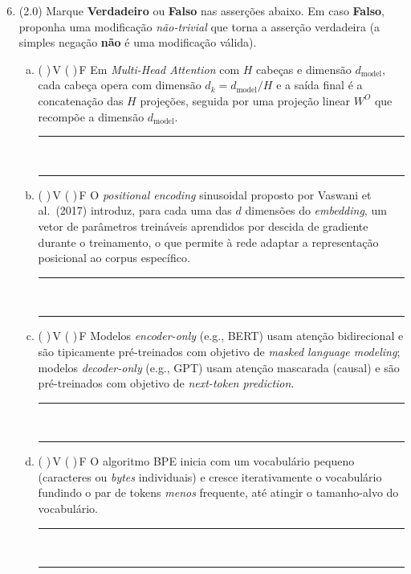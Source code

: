 \documentclass[11pt,a4paper]{article}
\begin{document}
\begin{enumerate}[1)]
\setcounter{enumi}{5}

\item (2.0) Marque \textbf{Verdadeiro} ou \textbf{Falso} nas asserções abaixo. Em caso \textbf{Falso}, proponha uma modificação \emph{não-trivial} que torna a asserção verdadeira (a simples negação \textbf{não} é uma modificação válida).

\begin{enumerate}[a)]
    \item ( )\,V \quad ( )\,F \quad Em \textit{Multi-Head Attention} com $H$ cabeças e dimensão $d_\text{model}$, cada cabeça opera com dimensão $d_k = d_\text{model}/H$ e a saída final é a concatenação das $H$ projeções, seguida por uma projeção linear $W^O$ que recompõe a dimensão $d_\text{model}$.\\[0.2em]
    \rule{\linewidth}{0.4pt}\\[0.2em]
    \rule{\linewidth}{0.4pt}

    \item ( )\,V \quad ( )\,F \quad O \textit{positional encoding} sinusoidal proposto por Vaswani et al.\ (2017) introduz, para cada uma das $d$ dimensões do \textit{embedding}, um vetor de parâmetros treináveis aprendidos por descida de gradiente durante o treinamento, o que permite à rede adaptar a representação posicional ao corpus específico.\\[0.2em]
    \rule{\linewidth}{0.4pt}\\[0.2em]
    \rule{\linewidth}{0.4pt}

    \item ( )\,V \quad ( )\,F \quad Modelos \textit{encoder-only} (e.g., BERT) usam atenção bidirecional e são tipicamente pré-treinados com objetivo de \textit{masked language modeling}; modelos \textit{decoder-only} (e.g., GPT) usam atenção mascarada (causal) e são pré-treinados com objetivo de \textit{next-token prediction}.\\[0.2em]
    \rule{\linewidth}{0.4pt}\\[0.2em]
    \rule{\linewidth}{0.4pt}

    \item ( )\,V \quad ( )\,F \quad O algoritmo BPE inicia com um vocabulário pequeno (caracteres ou \textit{bytes} individuais) e cresce iterativamente o vocabulário fundindo o par de tokens \emph{menos} frequente, até atingir o tamanho-alvo do vocabulário.\\[0.2em]
    \rule{\linewidth}{0.4pt}\\[0.2em]
    \rule{\linewidth}{0.4pt}


\end{enumerate}
\end{enumerate}
\end{document}
